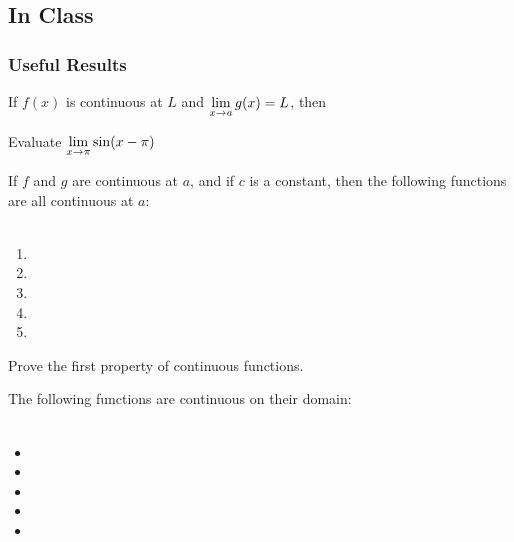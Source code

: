\documentclass[notes]{subfiles}
\begin{document}
	\subsection*{In Class}
	\subsubsection*{Useful Results}
		\begin{thm}
			If \(f(x)\) is continuous at \(L\) and \(\displaystyle \lim_{x\to a} g(x) = L\), then \\[50pt]
		\end{thm}
			
		\begin{ex}
			Evaluate \(\displaystyle \lim_{x\to \pi} \sin (x-\pi)\)
		\end{ex}
			
		\begin{thm}
			If \(f\) and \(g\) are continuous at \(a\), and if \(c\) is a constant, then the following functions are all continuous at \(a\): \\ \\
				\begin{enumerate}
				\setlength\itemsep{15pt}
					\item {}
					\item {}
					\item {}
					\item {}
					\item {}
				\end{enumerate}
		\end{thm}
			\newpage
			
		\begin{ex}
			Prove the first property of continuous functions.
		\end{ex}
		
		\begin{thm}
			The following functions are continuous on their domain: \\ \\
				\begin{itemize}
				\setlength\itemsep{15pt}
					\item {}
					\item {}
					\item {}
					\item {}
					\item {}
				\end{itemize}
			
		\end{thm}	
			\newpage
			
\end{document}
